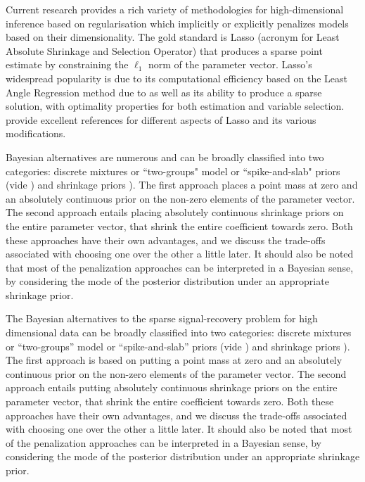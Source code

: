 \documentclass[11pt]{article}
\begin{document}
Current research provides a rich variety of methodologies for high-dimensional inference based on regularisation which implicitly or explicitly penalizes models based on their dimensionality. The gold standard is Lasso (acronym for Least Absolute Shrinkage and Selection Operator) that produces a sparse point estimate by constraining the $\ell_1$ norm of the parameter vector. Lasso's widespread popularity is due to its computational efficiency based on the Least Angle Regression method due to \cite{efron_least_2004} as well as its ability to produce a sparse solution, with optimality properties for both estimation and variable selection. \cite{buhlmann2011statistics, james2013introduction, hastie2015statistical} provide excellent references for different aspects of Lasso and its various modifications. \par 


Bayesian alternatives are numerous and can be broadly classified into two categories: discrete mixtures or ``two-groups" model or ``spike-and-slab" priors (vide \citet{johnstone2004needles,efron2010large,efron2008microarrays,bogdan2011asymptotic}) and shrinkage priors \cite{armagan2011generalized,armagan2013generalized,carvalho2009handling,carvalho2010horseshoe,griffin2005alternative,polson2010shrink,castillo2012needles}). The first approach places a point mass at zero and an absolutely continuous prior on the non-zero elements of the parameter vector.  The second approach entails placing absolutely continuous shrinkage priors on the entire parameter vector, that shrink the entire coefficient towards zero. Both these approaches have their own advantages, and we discuss the trade-offs associated with choosing one over the other a little later.  It should also be noted that most of the penalization approaches can be interpreted in a Bayesian sense, by considering the mode of the posterior distribution under an appropriate shrinkage prior. 


The Bayesian alternatives to the sparse signal-recovery problem for high
dimensional data can be broadly classified into two categories: discrete
mixtures or ``two-groups'' model or ``spike-and-slab'' priors (vide
\citet{johnstone2004needles,efron2010large,efron2008microarrays,bogdan2011asymptotic})
and shrinkage priors
\cite{armagan2011generalized,armagan2013generalized,carvalho2009handling,carvalho2010horseshoe,griffin2005alternative,polson2010shrink,castillo2012needles}).
The first approach is based on putting a point mass at zero and an absolutely
continuous prior on the non-zero elements of the parameter vector.  The second
approach entails putting absolutely continuous shrinkage priors on the entire
parameter vector, that shrink the entire coefficient towards zero. Both these
approaches have their own advantages, and we discuss the trade-offs associated
with choosing one over the other a little later.  It should also be noted that
most of the penalization approaches can be interpreted in a Bayesian sense, by
considering the mode of the posterior distribution under an appropriate
shrinkage prior. 
\end{document}
